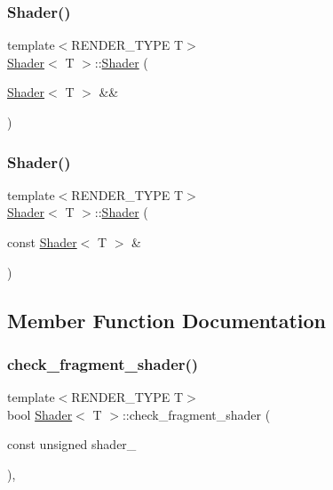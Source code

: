 \subsubsection{\texorpdfstring{Shader()}{Shader()}\hspace{0.1cm}{\footnotesize\ttfamily [7/8]}}
{\footnotesize\ttfamily template$<$R\+E\+N\+D\+E\+R\+\_\+\+T\+Y\+PE T$>$ \\
\mbox{\hyperlink{classShader}{Shader}}$<$ T $>$\+::\mbox{\hyperlink{classShader}{Shader}} (\begin{DoxyParamCaption}\item[{\mbox{\hyperlink{classShader}{Shader}}$<$ T $>$ \&\&}]{ }\end{DoxyParamCaption})\hspace{0.3cm}{\ttfamily [delete]}}

\mbox{\label{classShader_a49b2a448a00b5e1413c17501f8873cca}} 
\subsubsection{\texorpdfstring{Shader()}{Shader()}\hspace{0.1cm}{\footnotesize\ttfamily [8/8]}}
{\footnotesize\ttfamily template$<$R\+E\+N\+D\+E\+R\+\_\+\+T\+Y\+PE T$>$ \\
\mbox{\hyperlink{classShader}{Shader}}$<$ T $>$\+::\mbox{\hyperlink{classShader}{Shader}} (\begin{DoxyParamCaption}\item[{const \mbox{\hyperlink{classShader}{Shader}}$<$ T $>$ \&}]{ }\end{DoxyParamCaption})\hspace{0.3cm}{\ttfamily [delete]}}



\subsection{Member Function Documentation}
\mbox{\label{classShader_af80deea033a7fb48bc162b33056bd7a0}} 
\subsubsection{\texorpdfstring{check\+\_\+fragment\+\_\+shader()}{check\_fragment\_shader()}\hspace{0.1cm}{\footnotesize\ttfamily [1/2]}}
{\footnotesize\ttfamily template$<$R\+E\+N\+D\+E\+R\+\_\+\+T\+Y\+PE T$>$ \\
bool \mbox{\hyperlink{classShader}{Shader}}$<$ T $>$\+::check\+\_\+fragment\+\_\+shader (\begin{DoxyParamCaption}\item[{const unsigned}]{shader\+\_\+ }\end{DoxyParamCaption})\hspace{0.3cm}{\ttfamily [inline]}, {\ttfamily [protected]}}



